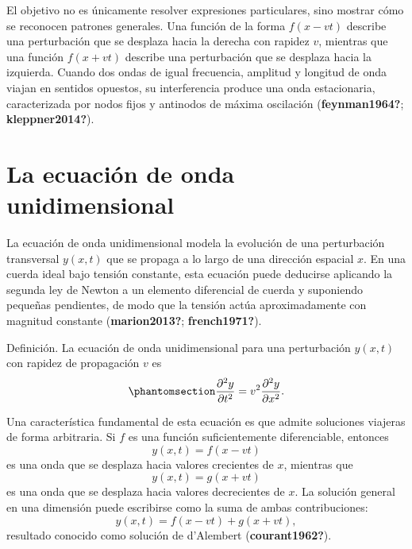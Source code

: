 \documentclass[
  letterpaper,
  DIV=11,
  numbers=noendperiod]{scrreprt}
\begin{document}
El objetivo no es únicamente resolver expresiones particulares, sino
mostrar cómo se reconocen patrones generales. Una función de la forma
\(f(x-vt)\) describe una perturbación que se desplaza hacia la derecha
con rapidez \(v\), mientras que una función \(f(x+vt)\) describe una
perturbación que se desplaza hacia la izquierda. Cuando dos ondas de
igual frecuencia, amplitud y longitud de onda viajan en sentidos
opuestos, su interferencia produce una onda estacionaria, caracterizada
por nodos fijos y antinodos de máxima oscilación (\textbf{feynman1964?};
\textbf{kleppner2014?}).

\section{La ecuación de onda
unidimensional}\label{la-ecuaciuxf3n-de-onda-unidimensional}

La ecuación de onda unidimensional modela la evolución de una
perturbación transversal \(y(x,t)\) que se propaga a lo largo de una
dirección espacial \(x\). En una cuerda ideal bajo tensión constante,
esta ecuación puede deducirse aplicando la segunda ley de Newton a un
elemento diferencial de cuerda y suponiendo pequeñas pendientes, de modo
que la tensión actúa aproximadamente con magnitud constante
(\textbf{marion2013?}; \textbf{french1971?}).

\begin{tcolorbox}[enhanced jigsaw, bottomrule=.15mm, rightrule=.15mm, colframe=quarto-callout-note-color-frame, leftrule=.75mm, breakable, arc=.35mm, toprule=.15mm, left=2mm, colback=white, opacityback=0]

Definición. La ecuación de onda unidimensional para una perturbación
\(y(x,t)\) con rapidez de propagación \(v\) es
\begin{equation}\phantomsection\label{eq-wave-1d}{
\frac{\partial^2 y}{\partial t^2}=v^2\frac{\partial^2 y}{\partial x^2}.
}\end{equation}

\end{tcolorbox}

Una característica fundamental de esta ecuación es que admite soluciones
viajeras de forma arbitraria. Si \(f\) es una función suficientemente
diferenciable, entonces \[
y(x,t)=f(x-vt)
\] es una onda que se desplaza hacia valores crecientes de \(x\),
mientras que \[
y(x,t)=g(x+vt)
\] es una onda que se desplaza hacia valores decrecientes de \(x\). La
solución general en una dimensión puede escribirse como la suma de ambas
contribuciones: \[
y(x,t)=f(x-vt)+g(x+vt),
\] resultado conocido como solución de d'Alembert
(\textbf{courant1962?}).
\end{document}
